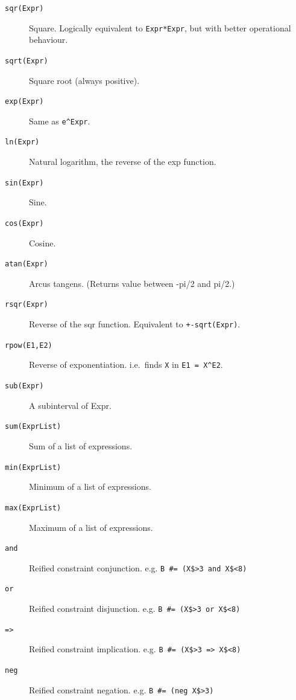 \begin{description}
\item[\texttt{sqr(Expr)}]
    Square. Logically equivalent to \verb|Expr*Expr|, but with better 
    operational behaviour.

\item[\texttt{sqrt(Expr)}]
    Square root (always positive).

\item[\texttt{exp(Expr)}]
    Same as \verb|e^Expr|.

\item[\texttt{ln(Expr)}]
    Natural logarithm, the reverse of the exp function.

\item[\texttt{sin(Expr)}]
    Sine.

\item[\texttt{cos(Expr)}]
    Cosine.

\item[\texttt{atan(Expr)}]
    Arcus tangens.  (Returns value between -pi/2 and pi/2.)

\item[\texttt{rsqr(Expr)}]
    Reverse of the sqr function. Equivalent to \verb|+-sqrt(Expr)|.

\item[\texttt{rpow(E1,E2)}]
    Reverse of exponentiation. i.e.\ finds \verb|X| in \verb|E1 = X^E2|.

\item[\texttt{sub(Expr)}]
    A subinterval of Expr.

\item[\texttt{sum(ExprList)}]
    Sum of a list of expressions.

\item[\texttt{min(ExprList)}]
    Minimum of a list of expressions.

\item[\texttt{max(ExprList)}]
    Maximum of a list of expressions.

\item[\texttt{and}]
     Reified constraint conjunction. e.g. \verb|B #= (X$>3 and X$<8)|

\item[\texttt{or}]
     Reified constraint disjunction. e.g. \verb|B #= (X$>3 or X$<8) |

\item[\texttt{=>}]
     Reified constraint implication. e.g. \verb|B #= (X$>3 => X$<8) |

\item[\texttt{neg}]
     Reified constraint negation. e.g. \verb|B #= (neg X$>3) |


\end{description}

